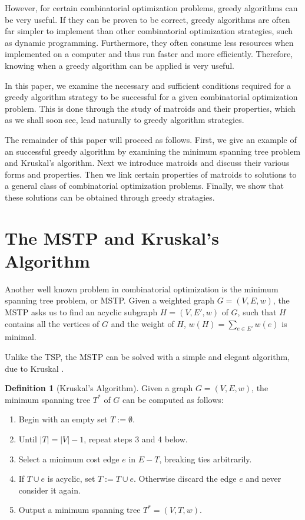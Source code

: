 \documentclass[a4paper,11pt]{report}
\theoremstyle{plain}
\theoremstyle{definition}
\newtheorem{defn}[defn]{Definition}
\begin{document}

However, for certain combinatorial optimization problems, greedy algorithms can
be very useful. If they can be proven to be correct, greedy algorithms are
often far simpler to implement than other combinatorial optimization
strategies, such as dynamic programming. Furthermore, they often consume less
resources when implemented on a computer and thus run faster and more
efficiently. Therefore, knowing when a greedy algorithm can be applied is very
useful.

In this paper, we examine the necessary and sufficient conditions required for
a greedy algorithm strategy to be successful for a given combinatorial
optimization problem. This is done through the study of matroids and their
properties, which as we shall soon see, lead naturally to greedy algorithm
strategies.

The remainder of this paper will proceed as follows. First, we give an example
of an successful greedy algorithm by examining the minimum spanning tree
problem and Kruskal's algorithm. Next we introduce matroids and discuss their
various forms and properties. Then we link certain properties of matroids to
solutions to a general class of combinatorial optimization problems. Finally,
we show that these solutions can be obtained through greedy stratagies.


\section{The MSTP and Kruskal's Algorithm}

Another well known problem in combinatorial optimization is the minimum
spanning tree problem, or MSTP\@. Given a weighted graph $G = (V,E,w)$, the
MSTP asks us to find an acyclic subgraph $H = (V,E',w)$ of $G$, such that $H$
contains all the vertices of $G$ and the weight of $H$, $w(H) = \sum_{e \in
E'}{w(e)}$ is minimal.

Unlike the TSP, the MSTP can be solved with a simple and elegant algorithm,
due to Kruskal \cite{clrs}.


\begin{defn}[Kruskal's Algorithm]
Given a graph $G = (V,E,w)$, the minimum spanning tree $T^*$ of
$G$ can be computed as follows:
\begin{enumerate}
    \item Begin with an empty set $T := \emptyset$.
    \item Until $|T| = |V| - 1$, repeat steps 3 and 4 below.
    \item Select a minimum cost edge $e$ in $E - T$, breaking ties
    arbitrarily.
    \item If $T \cup e$ is acyclic, set $T := T \cup e$. Otherwise discard
    the edge $e$ and never consider it again.
    \item Output a minimum spanning tree $T^* = (V,T,w)$.
\end{enumerate}
\end{defn}
\end{document}
